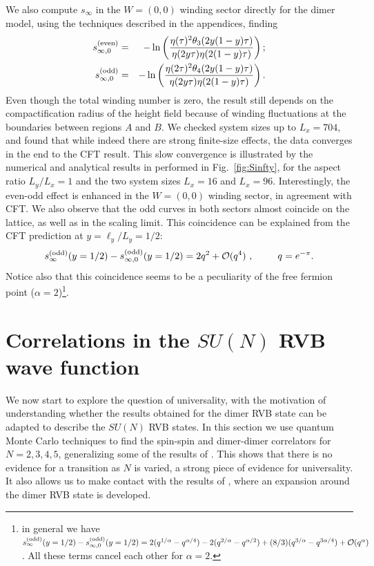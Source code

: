 \documentclass[11pt]{iopart}
\begin{document}
We also compute $s_\infty$ in the $W=(0,0)$ winding sector directly for the dimer model, using the techniques described in the appendices, finding
\begin{eqnarray}\label{eq:cft_w0}
 s_{\infty,0}^{\rm (even)}&=&-\ln \left(\frac{\eta(\tau)^2\theta_3(2y(1-y)\tau)}{\eta(2y\tau)\eta(2(1-y)\tau)}\right);\\\label{eq:cft_w0_odd}
 s_{\infty,0}^{\rm (odd)}&=&-\ln \left(\frac{\eta(2\tau)^2\theta_4(2y(1-y)\tau)}{\eta(2y\tau)\eta(2(1-y)\tau)}\right).
\end{eqnarray}
Even though the total winding number is zero, the result still depends on the compactification radius of the height field  because of winding fluctuations at the boundaries between regions $A$ and $B$. 
We checked system sizes up to $L_x=704$, and found that while indeed there are strong finite-size effects, the data converges in the end to the CFT result. 
This slow convergence is illustrated by the numerical and analytical results in performed in Fig.~\ref{fig:Sinfty}, for the aspect ratio $L_y/L_x=1$ and the two system sizes $L_x=16$ and $L_x=96$. 
Interestingly, the even-odd effect is enhanced in the $W=(0,0)$ winding sector, in agreement with CFT. We also observe that the odd curves in both sectors almost coincide on the lattice, as well as in the scaling limit. This coincidence can be explained from the CFT prediction at $y=\ell_y/L_y=1/2$:
\begin{equation}
 s_{\infty}^{\rm (odd)}(y=1/2)-s_{\infty,0}^{\rm (odd)}(y=1/2)=2q^2+\mathcal{O}(q^4) \ ,\qquad q=e^{-\pi}.
\end{equation}
Notice also that this coincidence seems to be a peculiarity of the free fermion point ($\alpha=2$)\footnote{in general we have $s_{\infty}^{\rm (odd)}(y=1/2)-s_{\infty,0}^{\rm (odd)}(y=1/2)=2(q^{1/\alpha}-q^{\alpha/4})-2(q^{2/\alpha}-q^{\alpha/2})+(8/3)(q^{3/\alpha}-q^{3\alpha/4})+\mathcal{O}(q^{\alpha})$. All these terms cancel each other for $\alpha=2$.}. 


\section{Correlations in the $SU(N)$ RVB wave function}
\label{sec:correlations}
We now start to explore the question of universality, with the motivation of understanding whether the results obtained for the dimer RVB state can be adapted to describe the $SU(N)$ RVB states. In this section we use quantum Monte Carlo techniques to find the spin-spin and dimer-dimer correlators for $N=2,3,4,5$, generalizing some of the results of \cite{RVB1,RVB2}. This shows that there is no evidence for a transition as $N$ is varied, a strong piece of evidence for universality. It also allows us to make contact with the results of \cite{Damle}, where an expansion around the dimer RVB state is developed.
\end{document}
